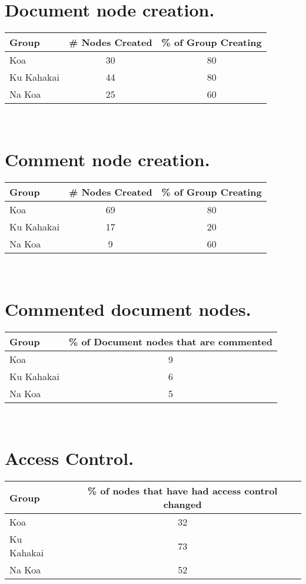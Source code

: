 \section{Document node creation.}
\begin{tabular}{|l|c|c|}
\hline
Group&\# Nodes Created&\% of Group Creating\\
\hline
Koa&30&80\\
\hline
Ku Kahakai&44&80\\
\hline
Na Koa&25&60\\
\hline
\end{tabular} \\

\section{Comment node creation.}
\begin{tabular}{|l|c|c|}
\hline
Group&\# Nodes Created&\% of Group Creating\\
\hline
Koa&69&80\\
\hline
Ku Kahakai&17&20\\
\hline
Na Koa&9&60\\
\hline
\end{tabular} \\

\section{Commented document nodes.}
\begin{tabular}{|l|c|}
\hline
Group&\% of Document nodes that are commented\\
\hline
Koa&9\\
\hline
Ku Kahakai&6\\
\hline
Na Koa&5\\
\hline
\end{tabular} \\


\section{Access Control.}
\begin{tabular}{|l|c|}
\hline
Group&\% of nodes that have had access control changed\\
\hline
Koa&32\\
\hline
Ku Kahakai&73\\
\hline
Na Koa&52\\
\hline
\end{tabular} \\


